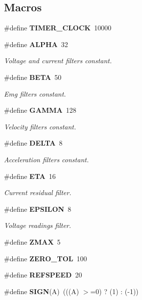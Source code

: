 \subsection*{Macros}
\begin{DoxyCompactItemize}
\item 
\mbox{\label{utils_8h_a05ec5d63e2ba7621d706137124efca7d}} 
\#define {\bfseries T\+I\+M\+E\+R\+\_\+\+C\+L\+O\+CK}~10000
\item 
\mbox{\label{utils_8h_af5abd28c44c29b7397c84f1fec4b1d84}} 
\#define \textbf{ A\+L\+P\+HA}~32
\begin{DoxyCompactList}\small\item\em Voltage and current filters constant. \end{DoxyCompactList}\item 
\mbox{\label{utils_8h_a1b996515309fc3c03449912bb33046e3}} 
\#define \textbf{ B\+E\+TA}~50
\begin{DoxyCompactList}\small\item\em Emg filters constant. \end{DoxyCompactList}\item 
\mbox{\label{utils_8h_a8659b9de3e544ff142b153b076f30fd5}} 
\#define \textbf{ G\+A\+M\+MA}~128
\begin{DoxyCompactList}\small\item\em Velocity filters constant. \end{DoxyCompactList}\item 
\mbox{\label{utils_8h_a3fd2b1bcd7ddcf506237987ad780f495}} 
\#define \textbf{ D\+E\+L\+TA}~8
\begin{DoxyCompactList}\small\item\em Acceleration filters constant. \end{DoxyCompactList}\item 
\mbox{\label{utils_8h_af77edc1f833593caecfc032dcc5953a6}} 
\#define \textbf{ E\+TA}~16
\begin{DoxyCompactList}\small\item\em Current residual filter. \end{DoxyCompactList}\item 
\mbox{\label{utils_8h_a002b2f4894492820fe708b1b7e7c5e70}} 
\#define \textbf{ E\+P\+S\+I\+L\+ON}~8
\begin{DoxyCompactList}\small\item\em Voltage readings filter. \end{DoxyCompactList}\item 
\#define \textbf{ Z\+M\+AX}~5
\item 
\#define \textbf{ Z\+E\+R\+O\+\_\+\+T\+OL}~100
\item 
\#define \textbf{ R\+E\+F\+S\+P\+E\+ED}~20
\item 
\#define \textbf{ S\+I\+GN}(A)~(((A) $>$=0) ? (1) \+: (-\/1))
\end{DoxyCompactItemize}
